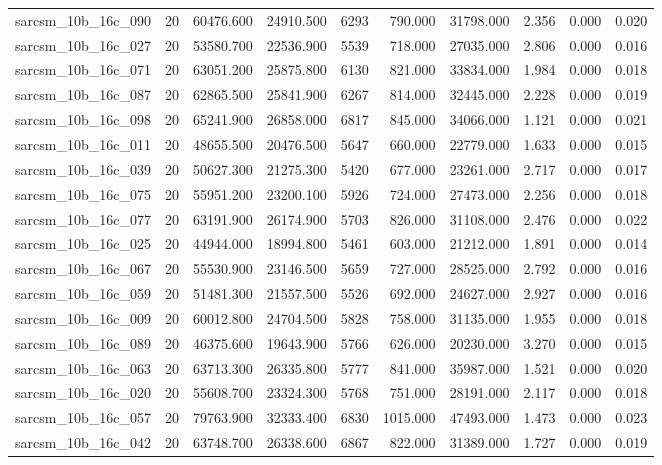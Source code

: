 \begin{tabular}{lrrrrrrrrr}
sarcsm\_10b\_16c\_090 & 20 & 60476.600 & 24910.500 & 6293 & 790.000 & 31798.000 & 2.356 & 0.000 & 0.020 \\
sarcsm\_10b\_16c\_027 & 20 & 53580.700 & 22536.900 & 5539 & 718.000 & 27035.000 & 2.806 & 0.000 & 0.016 \\
sarcsm\_10b\_16c\_071 & 20 & 63051.200 & 25875.800 & 6130 & 821.000 & 33834.000 & 1.984 & 0.000 & 0.018 \\
sarcsm\_10b\_16c\_087 & 20 & 62865.500 & 25841.900 & 6267 & 814.000 & 32445.000 & 2.228 & 0.000 & 0.019 \\
sarcsm\_10b\_16c\_098 & 20 & 65241.900 & 26858.000 & 6817 & 845.000 & 34066.000 & 1.121 & 0.000 & 0.021 \\
sarcsm\_10b\_16c\_011 & 20 & 48655.500 & 20476.500 & 5647 & 660.000 & 22779.000 & 1.633 & 0.000 & 0.015 \\
sarcsm\_10b\_16c\_039 & 20 & 50627.300 & 21275.300 & 5420 & 677.000 & 23261.000 & 2.717 & 0.000 & 0.017 \\
sarcsm\_10b\_16c\_075 & 20 & 55951.200 & 23200.100 & 5926 & 724.000 & 27473.000 & 2.256 & 0.000 & 0.018 \\
sarcsm\_10b\_16c\_077 & 20 & 63191.900 & 26174.900 & 5703 & 826.000 & 31108.000 & 2.476 & 0.000 & 0.022 \\
sarcsm\_10b\_16c\_025 & 20 & 44944.000 & 18994.800 & 5461 & 603.000 & 21212.000 & 1.891 & 0.000 & 0.014 \\
sarcsm\_10b\_16c\_067 & 20 & 55530.900 & 23146.500 & 5659 & 727.000 & 28525.000 & 2.792 & 0.000 & 0.016 \\
sarcsm\_10b\_16c\_059 & 20 & 51481.300 & 21557.500 & 5526 & 692.000 & 24627.000 & 2.927 & 0.000 & 0.016 \\
sarcsm\_10b\_16c\_009 & 20 & 60012.800 & 24704.500 & 5828 & 758.000 & 31135.000 & 1.955 & 0.000 & 0.018 \\
sarcsm\_10b\_16c\_089 & 20 & 46375.600 & 19643.900 & 5766 & 626.000 & 20230.000 & 3.270 & 0.000 & 0.015 \\
sarcsm\_10b\_16c\_063 & 20 & 63713.300 & 26335.800 & 5777 & 841.000 & 35987.000 & 1.521 & 0.000 & 0.020 \\
sarcsm\_10b\_16c\_020 & 20 & 55608.700 & 23324.300 & 5768 & 751.000 & 28191.000 & 2.117 & 0.000 & 0.018 \\
sarcsm\_10b\_16c\_057 & 20 & 79763.900 & 32333.400 & 6830 & 1015.000 & 47493.000 & 1.473 & 0.000 & 0.023 \\
sarcsm\_10b\_16c\_042 & 20 & 63748.700 & 26338.600 & 6867 & 822.000 & 31389.000 & 1.727 & 0.000 & 0.019 \\

\end{tabular}
